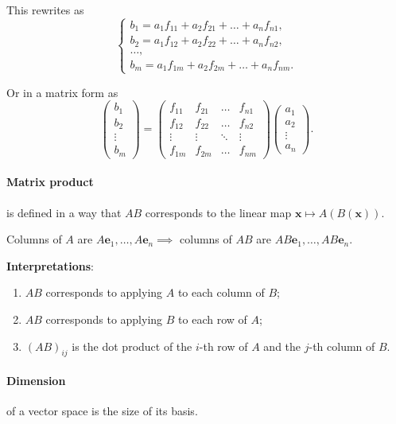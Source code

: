 \documentclass{article}
\begin{document}
This rewrites as
$$
\begin{cases}
b_1 = a_1 f_{11} + a_2 f_{21} + \dots + a_n f_{n1}, \\
b_2 = a_1 f_{12} + a_2 f_{22} + \dots + a_n f_{n2}, \\
\dots, \\
b_m = a_1 f_{1m} + a_2 f_{2m} + \dots + a_n f_{nm}.
\end{cases}
$$

Or in a matrix form as
$$
\begin{pmatrix}
b_1 \\ b_2 \\ \vdots \\ b_m
\end{pmatrix} = 
\begin{pmatrix}
f_{11} & f_{21} & \dots & f_{n1} \\
f_{12} & f_{22} & \dots & f_{n2} \\
\vdots & \vdots & \ddots & \vdots \\
f_{1m} & f_{2m} & \dots & f_{nm}
\end{pmatrix} \begin{pmatrix}
a_1 \\ a_2 \\ \vdots \\ a_n
\end{pmatrix}.
$$

\paragraph{Matrix product} is defined in a way that $AB$ corresponds to the linear map $\mathbf x \mapsto A(B(\mathbf x))$.

Columns of $A$ are $A \mathbf e_1, \dots, A \mathbf e_n \implies$ columns of $AB$ are $AB \mathbf e_1, \dots, AB \mathbf e_n$.

\textbf{Interpretations}:

\begin{enumerate}
    \item $AB$ corresponds to applying $A$ to each column of $B$;
    \item $AB$ corresponds to applying $B$ to each row of $A$;
    \item $(AB)_{ij}$ is the dot product of the $i$-th row of $A$ and the $j$-th column of $B$.
\end{enumerate}

\paragraph{Dimension} of a vector space is the size of its basis.
\end{document}
